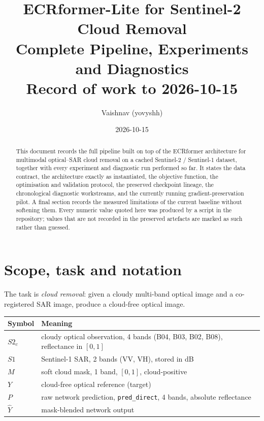\documentclass[10pt,a4paper]{article}
\title{\textbf{ECRformer-Lite for Sentinel-2 Cloud Removal}\\[0.3em]
\large Complete Pipeline, Experiments and Diagnostics\\[0.2em]
\normalsize Record of work to 2026-10-15}
\author{Vaishnav (yovyshh)}
\date{2026-10-15}
\newcommand{\code}[1]{\texttt{#1}}
\begin{document}
\maketitle

\begin{abstract}
\noindent
This document records the full pipeline built on top of the ECRformer architecture for
multimodal optical--SAR cloud removal on a cached Sentinel-2 / Sentinel-1 dataset, together with
every experiment and diagnostic run performed so far. It states the data contract, the
architecture exactly as instantiated, the objective function, the optimisation and validation
protocol, the preserved checkpoint lineage, the chronological diagnostic workstreams, and the
currently running gradient-preservation pilot. A final section records the measured limitations
of the current baseline without softening them. Every numeric value quoted here was produced by a
script in the repository; values that are not recorded in the preserved artefacts are marked as
such rather than guessed.
\end{abstract}

\tableofcontents

\section{Scope, task and notation}

The task is \emph{cloud removal}: given a cloudy multi-band optical image and a co-registered
SAR image, produce a cloud-free optical image.

\begin{center}
\begin{tabular}{@{}ll@{}}
\hline
Symbol & Meaning \\
\hline
$S2_c$ & cloudy optical observation, 4 bands (B04, B03, B02, B08), reflectance in $[0,1]$ \\
$S1$   & Sentinel-1 SAR, 2 bands (VV, VH), stored in dB \\
$M$    & soft cloud mask, 1 band, $[0,1]$, cloud-positive \\
$Y$    & cloud-free optical reference (target) \\
$P$    & raw network prediction, \code{pred\_direct}, 4 bands, absolute reflectance \\
$\hat Y$ & mask-blended network output \\
\hline
\end{tabular}
\end{center}
\end{document}
